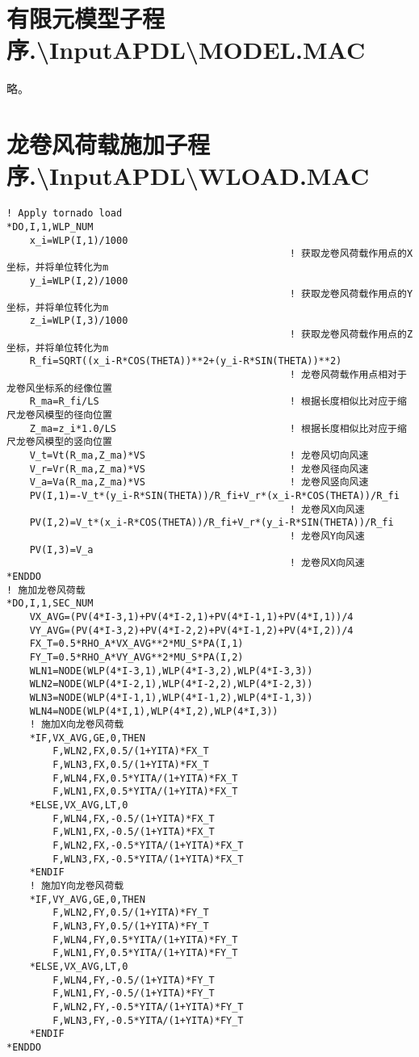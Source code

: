 \section{有限元模型子程序.\textbackslash{}InputAPDL\textbackslash{}MODEL.MAC}
略。

\section{龙卷风荷载施加子程序.\textbackslash{}InputAPDL\textbackslash{}WLOAD.MAC}
\begin{verbatim}
! Apply tornado load
*DO,I,1,WLP_NUM
    x_i=WLP(I,1)/1000                            
                                                 ! 获取龙卷风荷载作用点的X坐标，并将单位转化为m
    y_i=WLP(I,2)/1000                            
                                                 ! 获取龙卷风荷载作用点的Y坐标，并将单位转化为m
    z_i=WLP(I,3)/1000                            
                                                 ! 获取龙卷风荷载作用点的Z坐标，并将单位转化为m
    R_fi=SQRT((x_i-R*COS(THETA))**2+(y_i-R*SIN(THETA))**2)
                                                 ! 龙卷风荷载作用点相对于龙卷风坐标系的经像位置
    R_ma=R_fi/LS                                 ! 根据长度相似比对应于缩尺龙卷风模型的径向位置
    Z_ma=z_i*1.0/LS                              ! 根据长度相似比对应于缩尺龙卷风模型的竖向位置
    V_t=Vt(R_ma,Z_ma)*VS                         ! 龙卷风切向风速
    V_r=Vr(R_ma,Z_ma)*VS                         ! 龙卷风径向风速
    V_a=Va(R_ma,Z_ma)*VS                         ! 龙卷风竖向风速
    PV(I,1)=-V_t*(y_i-R*SIN(THETA))/R_fi+V_r*(x_i-R*COS(THETA))/R_fi
                                                 ! 龙卷风X向风速
    PV(I,2)=V_t*(x_i-R*COS(THETA))/R_fi+V_r*(y_i-R*SIN(THETA))/R_fi
                                                 ! 龙卷风Y向风速
    PV(I,3)=V_a
                                                 ! 龙卷风X向风速
*ENDDO
! 施加龙卷风荷载
*DO,I,1,SEC_NUM
    VX_AVG=(PV(4*I-3,1)+PV(4*I-2,1)+PV(4*I-1,1)+PV(4*I,1))/4
    VY_AVG=(PV(4*I-3,2)+PV(4*I-2,2)+PV(4*I-1,2)+PV(4*I,2))/4
    FX_T=0.5*RHO_A*VX_AVG**2*MU_S*PA(I,1)
    FY_T=0.5*RHO_A*VY_AVG**2*MU_S*PA(I,2)
    WLN1=NODE(WLP(4*I-3,1),WLP(4*I-3,2),WLP(4*I-3,3))
    WLN2=NODE(WLP(4*I-2,1),WLP(4*I-2,2),WLP(4*I-2,3))
    WLN3=NODE(WLP(4*I-1,1),WLP(4*I-1,2),WLP(4*I-1,3))
    WLN4=NODE(WLP(4*I,1),WLP(4*I,2),WLP(4*I,3))
    ! 施加X向龙卷风荷载
    *IF,VX_AVG,GE,0,THEN
        F,WLN2,FX,0.5/(1+YITA)*FX_T
        F,WLN3,FX,0.5/(1+YITA)*FX_T
        F,WLN4,FX,0.5*YITA/(1+YITA)*FX_T
        F,WLN1,FX,0.5*YITA/(1+YITA)*FX_T
    *ELSE,VX_AVG,LT,0
        F,WLN4,FX,-0.5/(1+YITA)*FX_T
        F,WLN1,FX,-0.5/(1+YITA)*FX_T
        F,WLN2,FX,-0.5*YITA/(1+YITA)*FX_T
        F,WLN3,FX,-0.5*YITA/(1+YITA)*FX_T
    *ENDIF
    ! 施加Y向龙卷风荷载
    *IF,VY_AVG,GE,0,THEN
        F,WLN2,FY,0.5/(1+YITA)*FY_T
        F,WLN3,FY,0.5/(1+YITA)*FY_T
        F,WLN4,FY,0.5*YITA/(1+YITA)*FY_T
        F,WLN1,FY,0.5*YITA/(1+YITA)*FY_T
    *ELSE,VX_AVG,LT,0
        F,WLN4,FY,-0.5/(1+YITA)*FY_T
        F,WLN1,FY,-0.5/(1+YITA)*FY_T
        F,WLN2,FY,-0.5*YITA/(1+YITA)*FY_T
        F,WLN3,FY,-0.5*YITA/(1+YITA)*FY_T
    *ENDIF
*ENDDO

\end{verbatim}

